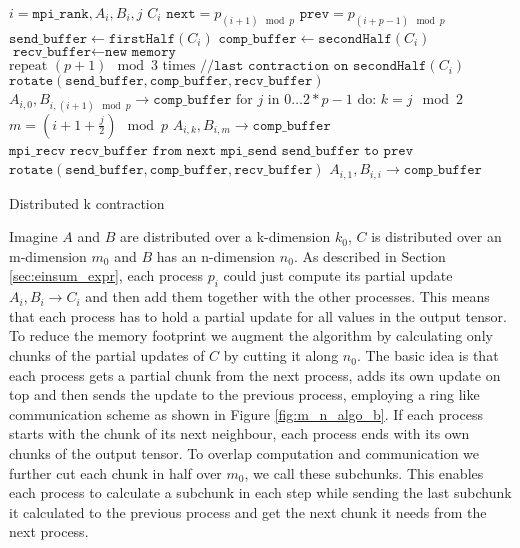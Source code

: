 \begin{algorithm}[ht]
    \begin{algorithmic}
    \Require $i = \texttt{mpi\_rank}, A_i, B_i, j$
    \Ensure $C_i$
    \State $\texttt{next} = p_{(i+1) \mod p}$
    \State $\texttt{prev} = p_{(i+p-1) \mod p}$
    \State $\texttt{send\_buffer} \gets \texttt{firstHalf}(C_i)$
    \State $\texttt{comp\_buffer} \gets \texttt{secondHalf}(C_i)$
    \State $\texttt{recv\_buffer} \gets \texttt{new memory}$
    \State $\text{repeat } (p+1) \mod 3 \text{ times} \texttt{ //last contraction on secondHalf}(C_i)$ 
    \State \indent $\texttt{rotate}(\texttt{send\_buffer},\texttt{comp\_buffer},\texttt{recv\_buffer})$
    \State $A_{i,0}, B_{i,(i+1) \mod p} \rightarrow \texttt{comp\_buffer}$
    \State  $\text{for } j \text{ in } 0\dots 2 * p - 1 \text{ do:}$
    \State \indent $ k = j \mod 2 $
    \State \indent $ m = (i + 1 + \frac{j}{2}) \mod p$
    \State \indent {}
    \State \indent \indent $A_{i,k}, B_{i,m} \rightarrow \texttt{comp\_buffer}$
    \State \indent \indent $\texttt{mpi\_recv recv\_buffer from next}$
    \State \indent \indent $\texttt{mpi\_send send\_buffer to prev}$
    \State \indent $\texttt{rotate}(\texttt{send\_buffer},\texttt{comp\_buffer},\texttt{recv\_buffer})$
    \State $A_{i,1}, B_{i,i} \rightarrow \texttt{comp\_buffer}$

\end{algorithmic}
\caption{Distributed k contraction}
\label{alg:k_pseudocode}
\end{algorithm}


Imagine $A$ and $B$ are distributed over a k-dimension $k_0$, $C$ is distributed over an m-dimension $m_0$ and $B$ has an n-dimension $n_0$.
As described in Section \ref{sec:einsum_expr}, each process $p_i$ could just compute its partial update $A_i, B_i \rightarrow C_i$ and then add them together with the other processes.
This means that each process has to hold a partial update for all values in the output tensor.
To reduce the memory footprint we augment the algorithm by calculating only chunks of the partial updates of $C$ by cutting it along $n_0$.
The basic idea is that each process gets a partial chunk from the next process, adds its own update on top and then sends the update to the previous process, employing a ring like communication scheme as shown in Figure \ref{fig:m_n_algo_b}.
If each process starts with the chunk of its next neighbour, each process ends with its own chunks of the output tensor.
To overlap computation and communication we further cut each chunk in half over $m_0$, we call these subchunks.
This enables each process to calculate a subchunk in each step while sending the last subchunk it calculated to the previous process and get the next chunk it needs from the next process.

